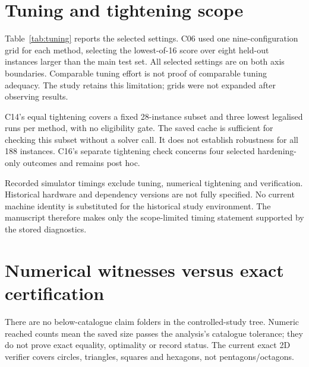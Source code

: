 \documentclass[11pt]{article}
\begin{document}
\section{Tuning and tightening scope}
\begin{table}[ht]\centering\small\caption{C06 selected settings. Symbols follow the manuscript: $\mu$ pressure, $\nu$ noise multiplier, $\gamma_0$ initial scale and $T_0$ annealing temperature; kick and relaxation steps describe pc.}\label{tab:tuning}\end{table}\FloatBarrier
Table~\ref{tab:tuning} reports the selected settings. C06 used one nine-configuration grid for each method, selecting the lowest-of-16 score over eight held-out instances larger than the main test set. All selected settings are on both axis boundaries. Comparable tuning effort is not proof of comparable tuning adequacy. The study retains this limitation; grids were not expanded after observing results.

C14's equal tightening covers a fixed 28-instance subset and three lowest legalised runs per method, with no eligibility gate. The saved cache is sufficient for checking this subset without a solver call. It does not establish robustness for all 188 instances. C16's separate tightening check concerns four selected hardening-only outcomes and remains post hoc.

Recorded simulator timings exclude tuning, numerical tightening and verification. Historical hardware and dependency versions are not fully specified. No current machine identity is substituted for the historical study environment. The manuscript therefore makes only the scope-limited timing statement supported by the stored diagnostics.

\section{Numerical witnesses versus exact certification}
There are no below-catalogue claim folders in the controlled-study tree. Numeric reached counts mean the saved size passes the analysis's catalogue tolerance; they do not prove exact equality, optimality or record status. The current exact 2D verifier covers circles, triangles, squares and hexagons, not pentagons/octagons.
\end{document}
